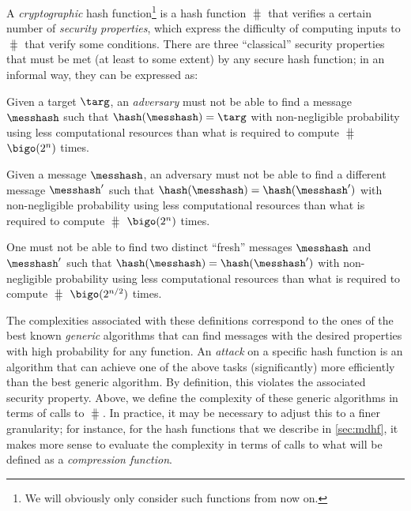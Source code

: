 A \emph{cryptographic} hash function\footnote{We will obviously only consider such functions from now on.} is a hash function $\hash$ that verifies a certain number of \emph{security properties}, which express the difficulty of computing inputs
to $\hash$ that verify some conditions. There are three ``classical'' security properties that must be met (at least to some extent)
by any secure hash function; in an informal way, they can be expressed as:
\begin{defi} Given a target $\targ$, an \emph{adversary} must not be able to find a message $\messhash$ such that $\hash(\messhash) = \targ$ with non-negligible probability using
less computational resources than what is required to compute $\hash$ $\bigo(2^n)$ times.
\end{defi}
\begin{defi} Given a message $\messhash$, an adversary must not be able to find a different message $\messhash'$ such that
$\hash(\messhash) = \hash(\messhash')$  with non-negligible probability using less computational resources than what is required to compute $\hash$ $\bigo(2^n)$ times.
\end{defi}
\begin{defi} One must not be able to find two distinct ``fresh'' messages $\messhash$ and $\messhash'$ such that $\hash(\messhash) =
\hash(\messhash')$ with non-negligible probability using less computational resources than what is required to compute $\hash$ $\bigo(2^{n/2})$ times.
\end{defi}

The complexities associated with these definitions correspond to the ones of the best known \emph{generic} algorithms that can find messages with the desired
properties with high probability for any function. An \emph{attack} on a specific hash function is an algorithm that can achieve one of the above tasks (significantly)
more efficiently than the best generic algorithm. By definition, this violates the associated security property.
Above, we define the complexity of these generic algorithms in terms of calls to $\hash$. In practice, it may be necessary to adjust
this to a finer granularity; for instance, for the \merkdam hash functions that we describe in \autoref{sec:mdhf}, it makes more sense to evaluate the complexity
in terms of calls to what will be defined as a \emph{compression function}.

